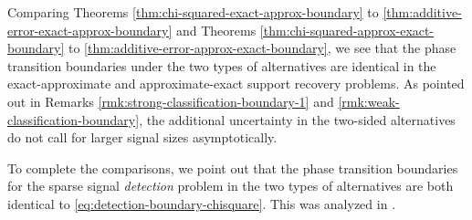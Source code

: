 \begin{remark}
Comparing Theorems \ref{thm:chi-squared-exact-approx-boundary} to \ref{thm:additive-error-exact-approx-boundary} and Theorems \ref{thm:chi-squared-approx-exact-boundary} to \ref{thm:additive-error-approx-exact-boundary}, we see that the phase transition boundaries under the two types of alternatives are identical in the exact-approximate and approximate-exact support recovery problems.
As pointed out in Remarks \ref{rmk:strong-classification-boundary-1} and \ref{rmk:weak-classification-boundary}, the additional uncertainty in the two-sided alternatives do not call for larger signal sizes asymptotically.

To complete the comparisons, we point out that the phase transition boundaries for the sparse signal \emph{detection} problem in the two types of alternatives are both identical to \eqref{eq:detection-boundary-chisquare}. This was analyzed in \cite{donoho2004higher}.
\end{remark}
